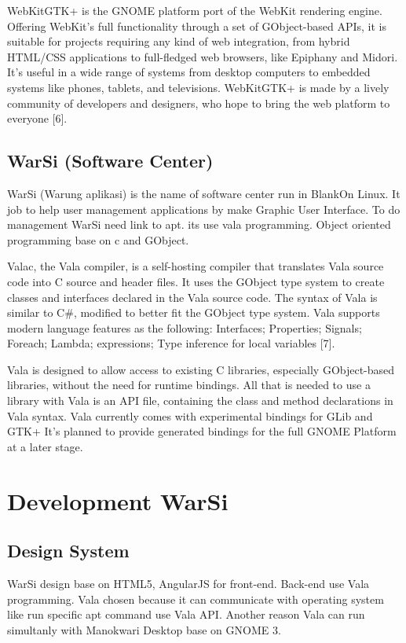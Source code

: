 \documentclass[conference, letterpaper]{IEEEtran}
\begin{document}
WebKitGTK+ is the GNOME platform port of the WebKit rendering engine. Offering WebKit’s full functionality through a set of GObject-based APIs, it is suitable for projects requiring any kind of web integration, from hybrid HTML/CSS applications to full-fledged web browsers, like Epiphany and Midori. It’s useful in a wide range of systems from desktop computers to embedded systems like phones, tablets, and televisions. WebKitGTK+ is made by a lively community of developers and designers, who hope to bring the web platform to everyone [6].

\subsection{WarSi (Software Center)}
WarSi (Warung aplikasi) is the name of software center run in BlankOn Linux. It job to help user management applications by make Graphic User Interface. To do management WarSi need link to apt. its use vala programming. Object oriented programming base on c and GObject. 

Valac, the Vala compiler, is a self-hosting compiler that translates Vala source code into C source and header files. It uses the GObject type system to create classes and interfaces declared in the Vala source code. The syntax of Vala is similar to C\#, modified to better fit the GObject type system. Vala supports modern language features as the following: Interfaces; Properties; Signals; Foreach; Lambda; expressions; Type inference for local variables [7].

Vala is designed to allow access to existing C libraries, especially GObject-based libraries, without the need for runtime bindings. All that is needed to use a library with Vala is an API file, containing the class and method declarations in Vala syntax. Vala currently comes with experimental bindings for GLib and GTK+ It's planned to provide generated bindings for the full GNOME Platform at a later stage.

\section{Development WarSi}
\subsection{Design System}

WarSi design base on HTML5, AngularJS for front-end. Back-end use Vala programming. Vala chosen because it can communicate with operating system like run specific apt command use Vala API. Another reason Vala can run simultanly with Manokwari Desktop base on GNOME 3.
\end{document}
